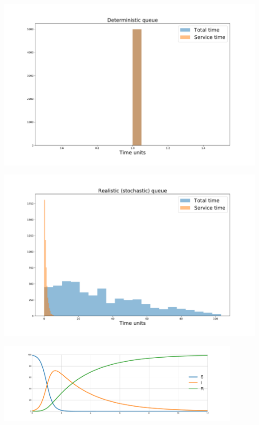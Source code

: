 \documentclass{beamer}
\begin{document}
\begin{frame}
    \begin{center}
        \includegraphics[width=\textwidth]{./img/deterministic_queue.pdf}
    \end{center}
\end{frame}

\begin{frame}
    \begin{center}
        \includegraphics[width=\textwidth]{./img/stochastic_queue.pdf}
    \end{center}
\end{frame}



\begin{frame}
	\begin{center}
	  \includegraphics[width=0.9\textwidth]{./img/SIR.pdf}
	\end{center}
\end{frame}
\end{document}
